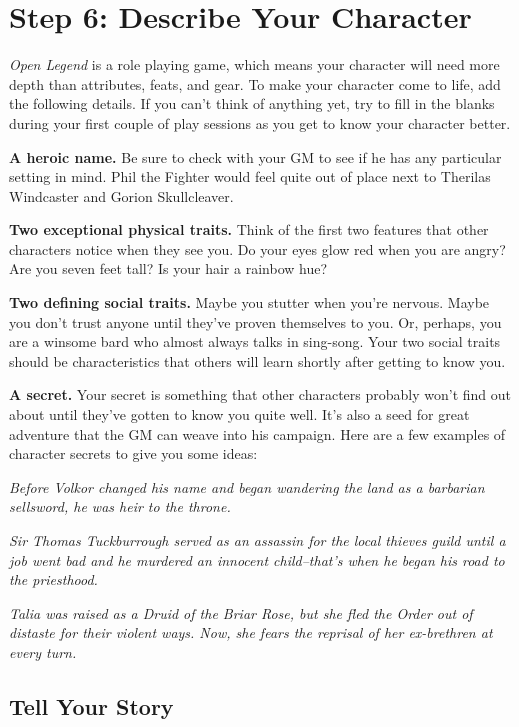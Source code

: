 \documentclass[12pt]{report}
\begin{document}
\section{Step 6: Describe Your
Character}\label{step-6-describe-your-character}

\emph{Open Legend }is a role playing game, which means your character
will need more depth than attributes, feats, and gear. To make your
character come to life, add the following details. If you can't think of
anything yet, try to fill in the blanks during your first couple of play
sessions as you get to know your character better.

\textbf{A heroic name.} Be sure to check with your GM to see if he has
any particular setting in mind. Phil the Fighter would feel quite out of
place next to Therilas Windcaster and Gorion Skullcleaver.

\textbf{Two exceptional physical traits.} Think of the first two
features that other characters notice when they see you. Do your eyes
glow red when you are angry? Are you seven feet tall? Is your hair a
rainbow hue?

\textbf{Two defining social traits. }Maybe you stutter when you're
nervous. Maybe you don't trust anyone until they've proven themselves to
you. Or, perhaps, you are a winsome bard who almost always talks in
sing-song. Your two social traits should be characteristics that others
will learn shortly after getting to know you.

\textbf{A secret.} Your secret is something that other characters
probably won't find out about until they've gotten to know you quite
well. It's also a seed for great adventure that the GM can weave into
his campaign. Here are a few examples of character secrets to give you
some ideas:

\emph{Before Volkor changed his name and began wandering the land as a
barbarian sellsword, he was heir to the throne.}

\emph{Sir Thomas Tuckburrough served as an assassin for the local
thieves guild until a job went bad and he murdered an innocent
child--that's when he began his road to the priesthood.}

\emph{Talia was raised as a Druid of the Briar Rose, but she fled the
Order out of distaste for their violent ways. Now, she fears the
reprisal of her ex-brethren at every turn.}

\subsection{Tell Your Story}\label{tell-your-story}
\end{document}
